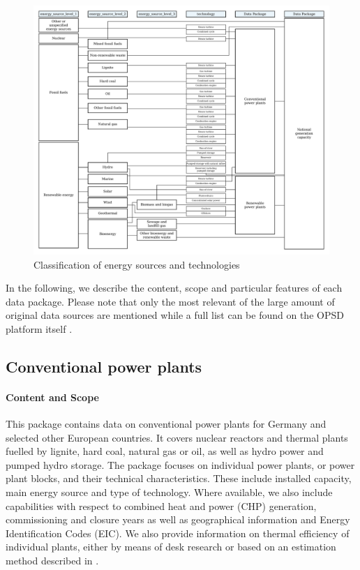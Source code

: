 \documentclass[article,sort&compress]{elsarticle}
\begin{document}
\begin{figure}[!h]
    \centering
    \includegraphics[width=1\textwidth]{figures/energy_source_tree.pdf}
    \caption{Classification of energy sources and technologies}
    \label{fig:energy_structure}
\end{figure}

In the following, we describe the content, scope and particular features of each data package. Please note that only the most relevant of the large amount of original data sources are mentioned while a full list can be found on the OPSD platform itself \cite{OPSD}.

\subsection{Conventional power plants}
\paragraph{Content and Scope}
This package contains data on conventional power plants for Germany and selected other European countries. It covers nuclear reactors and thermal plants fuelled by lignite, hard coal, natural gas or oil, as well as hydro power and pumped hydro storage. The package focuses on individual power plants, or power plant blocks, and their technical characteristics. These include installed capacity, main energy source and type of technology. Where available, we also include capabilities with respect to combined heat and power (CHP) generation, commissioning and closure years as well as geographical information and Energy Identification Codes (EIC). We also provide information on thermal efficiency of individual plants, either by means of desk research or based on an estimation method described in \cite{Egerer.2014}.
\end{document}
